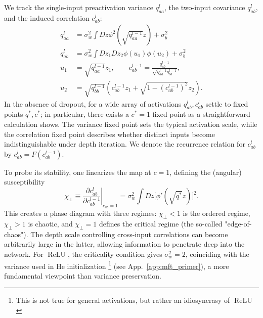 \documentclass{article}
\DeclareMathOperator{\ReLU}{ReLU}
\newcommand{\relu}{\ensuremath{\ReLU}}
\theoremstyle{plain}
\theoremstyle{definition}
\theoremstyle{remark}
\begin{document}
We track the single-input preactivation variance $q^l_{aa}$, the two-input covariance $q^l_{ab}$, and the induced correlation $c^l_{ab}$:
\relax
\begin{align}
q^{l}_{aa}&= \sigma_{w}^{2}\int Dz \phi^{2}\left(\sqrt{q^{l-1}_{aa}} z\right)+\sigma_{b}^{2}\\
q^{l}_{ab}&=\sigma_{w}^{2}\int Dz_{1} Dz_{2} \phi(u_{1}) \phi(u_{2})+\sigma_{b}^{2}\\
u_{1}&=\sqrt{q^{l-1}_{aa}} z_{1},\qquad c^{l-1}_{ab}=\frac{q^{l-1}_{ab}}{\sqrt{q^{l-1}_{aa} q^{l-1}_{bb}}},\\
u_{2}&=\sqrt{q^{l-1}_{bb}}\left(c^{l-1}_{ab} z_{1}+\sqrt{1-\left(c^{l-1}_{ab}\right)^{2}} z_{2}\right).
\label{variancerecursion}
\end{align}
\relax
In the absence of dropout, for a wide array of activations $q^{l}_{ab},c^{l}_{ab}$ settle to fixed points $q^*,c^*$; in particular, there exists a $c^*=1$ fixed point as a straightforward calculation shows. The variance fixed point sets the typical activation scale, while the correlation fixed point describes whether distinct inputs become indistinguishable under depth iteration. We denote the recurrence relation for $c^{l}_{ab}$ by $c^{l}_{ab}=F(c^{l-1}_{ab})$. 

To probe its stability, one linearizes the map at $c=1$, defining the (angular) susceptibility
\relax
\begin{equation}
\chi_{\perp} \equiv \left.\frac{\partial c^{l}_{ab}}{\partial c^{l-1}_{ab}}\right|_{c_{ab}=1} = \sigma_{w}^{2}\int Dz \big[\phi'(\sqrt{q^{*}} z)\big]^{2}.
\end{equation}
\relax
This creates a phase diagram with three regimes: $\chi_{\perp}<1$ is the ordered regime, $\chi_{\perp}>1$ is chaotic, and 
 $\chi_{\perp}=1$ defines the critical regime (the so-called "edge-of-chaos"). The depth scale controlling cross-input correlations can become arbitrarily large in the latter, allowing information to penetrate deep into the network. For \relu{}, the criticality condition gives $\sigma_w^2=2$, coinciding with the variance used in He initialization \cite{he2015delvingdeeprectifierssurpassing}\footnote{This is not true for general activations, but rather an idiosyncrasy of \relu{}} (see App.~\ref{app:mft_primer}), a more fundamental viewpoint than variance preservation. 
 
\end{document}
